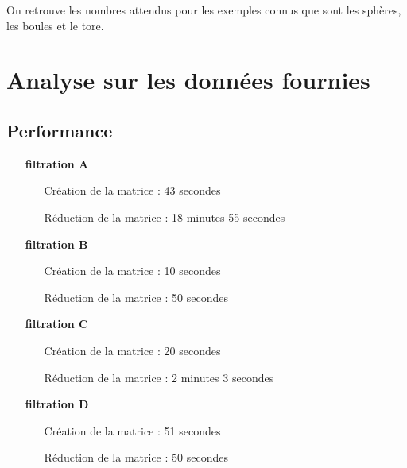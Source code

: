 \documentclass[french, a4paper, 12pt]{article}
\begin{document}
\vskip 0.5cm

On retrouve les nombres attendus pour les exemples connus que sont 
les sphères, les boules et le tore.

\section{Analyse sur les données fournies}

\subsection{Performance}

\begin{itemize}
    \item[\textbf{filtration A}] \hspace{1cm}
        \begin{itemize}
            \item[Création de la matrice :] 43 secondes %
            \item[Réduction de la matrice :] 18 minutes 55 secondes 
        \end{itemize}
    \item[\textbf{filtration B}] \hspace{1cm}
        \begin{itemize}
            \item[Création de la matrice :] 10 secondes %
            \item[Réduction de la matrice :] 50 secondes 
        \end{itemize}
    \item[\textbf{filtration C}] \hspace{1cm}
        \begin{itemize}
            \item[Création de la matrice :] 20 secondes %
            \item[Réduction de la matrice :] 2 minutes 3 secondes 
        \end{itemize}
    \item[\textbf{filtration D}] \hspace{1cm}
        \begin{itemize}
            \item[Création de la matrice :] 51 secondes
            \item[Réduction de la matrice :] 50 secondes 
        \end{itemize}
\end{itemize}
\end{document}
